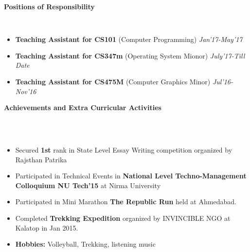 \documentclass[a4paper,10pt]{article}
\newcommand{\lsep}{-0.5cm}
\newcommand{\resheading}[1]{{\small \colorbox{mygrey}{\begin{minipage}{0.975\textwidth}{\textbf{#1 \vphantom{p\^{E}}}}\end{minipage}}}}
\begin{document}
\resheading{\textbf{\large Positions of Responsibility} }\\[\lsep]
\begin{itemize}
  

	\item \textbf{Teaching Assistant for CS101} (Computer Programming) \emph{Jan'17-May'17}\\[-0.6cm]

\item \textbf{Teaching Assistant for CS347m} (Operating System Mionor) \emph{July'17-Till Date}\\[-0.6cm]
	

\item \textbf{Teaching Assistant for CS475M} (Computer Graphics Minor) \emph{Jul'16-Nov'16}\\[-0.6cm]
\end{itemize}
\vskip 0.15in


\resheading{\textbf{\large Achievements and Extra Curricular Activities}}\\[\lsep]\\[-0.3cm]
\begin{itemize}
  \item Secured \textbf{1st} rank in State Level Essay Writing competition organized by Rajsthan Patrika
  	\item Participated in Technical Events in\textbf{ National Level Techno-Management Colloquium  NU Tech'15 } at Nirma University
  	\item Participated in Mini Marathon \textbf{The Republic Run}  held at Ahmedabad.
  \item Completed \textbf{Trekking Expedition} organized by INVINCIBLE NGO at Kalatop in Jan 2015.
  \item \textbf{Hobbies:} Volleyball, Trekking, listening music
\end{itemize}
\end{document}
